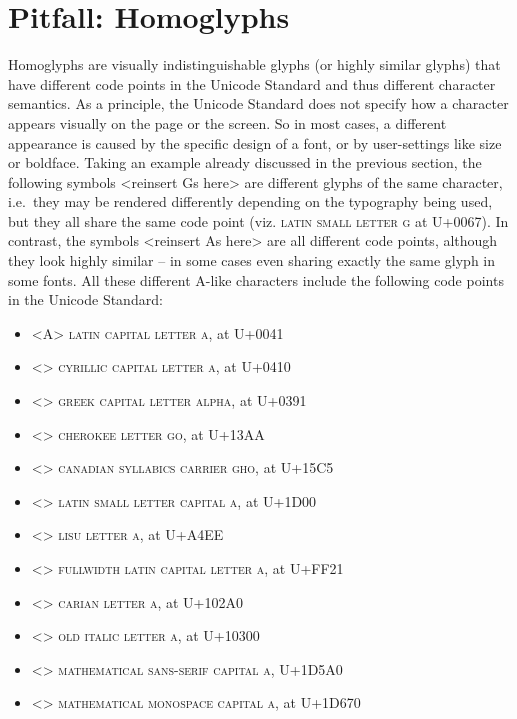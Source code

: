 \section{Pitfall: Homoglyphs}
\label{pitfall-homoglyphs}

Homoglyphs are visually indistinguishable glyphs (or highly similar glyphs) that have different code points in the Unicode Standard and thus different character semantics. As a principle, the Unicode Standard does not specify how a character appears visually on the page or the screen. So in most cases, a different appearance is caused by the specific design of a font, or by user-settings like size or boldface. Taking an example already discussed in the previous section, the following symbols <reinsert Gs here> are different glyphs of the same character, i.e.~they may be rendered differently depending on the typography being used, but they all share the same code point (viz. \textsc{latin small letter g} at U+0067). In contrast, the symbols <reinsert As here> are all different code points, although they look highly similar -- in some cases even sharing exactly the same glyph in some fonts. All these different A-like characters include the following code points in the Unicode Standard:

\begin{itemize}
	\item <A> \textsc{latin capital letter a}, at U+0041 
	\item <> \textsc{cyrillic capital letter a}, at U+0410 
	\item <> \textsc{greek capital letter alpha}, at U+0391 
	\item <> \textsc{cherokee letter go}, at U+13AA 
	\item <> \textsc{canadian syllabics carrier gho}, at U+15C5 
	\item <> \textsc{latin small letter capital a}, at U+1D00 
	\item <> \textsc{lisu letter a}, at U+A4EE 
	\item <> \textsc{fullwidth latin capital letter a}, at U+FF21 
	\item <> \textsc{carian letter a}, at U+102A0 
	\item <> \textsc{old italic letter a}, at U+10300 
	\item <> \textsc{mathematical sans-serif capital a}, U+1D5A0 
	\item <> \textsc{mathematical monospace capital a}, at U+1D670 
\end{itemize}

